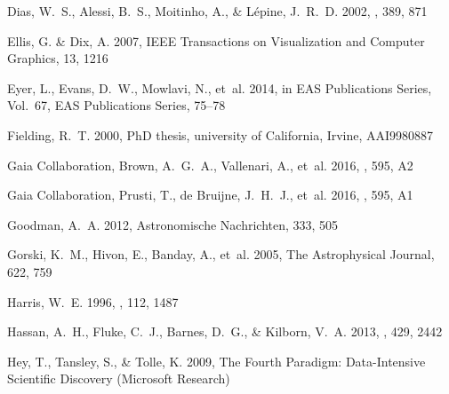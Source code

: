 \documentclass[longauth, final]{aa}
\begin{document}
\begin{thebibliography}{46}
{Dias}, W.~S., {Alessi}, B.~S., {Moitinho}, A., \& {L{\'e}pine}, J.~R.~D. 2002,
  \aap, 389, 871

Ellis, G. \& Dix, A. 2007, IEEE Transactions on Visualization and Computer
  Graphics, 13, 1216

{Eyer}, L., {Evans}, D.~W., {Mowlavi}, N., {et~al.} 2014, in EAS Publications
  Series, Vol.~67, EAS Publications Series, 75--78

Fielding, R.~T. 2000, PhD thesis, university of California, Irvine, AAI9980887

{Gaia Collaboration}, {Brown}, A.~G.~A., {Vallenari}, A., {et~al.}
  2016{}, \aap, 595, A2

{Gaia Collaboration}, {Prusti}, T., {de Bruijne}, J.~H.~J., {et~al.}
  2016{}, \aap, 595, A1

{Goodman}, A.~A. 2012, Astronomische Nachrichten, 333, 505

Gorski, K.~M., Hivon, E., Banday, A., {et~al.} 2005, The Astrophysical Journal,
  622, 759

{Harris}, W.~E. 1996, \aj, 112, 1487

{Hassan}, A.~H., {Fluke}, C.~J., {Barnes}, D.~G., \& {Kilborn}, V.~A. 2013,
  \mnras, 429, 2442

Hey, T., Tansley, S., \& Tolle, K. 2009, The Fourth Paradigm: Data-Intensive
  Scientific Discovery (Microsoft Research)


\end{thebibliography}
\end{document}
